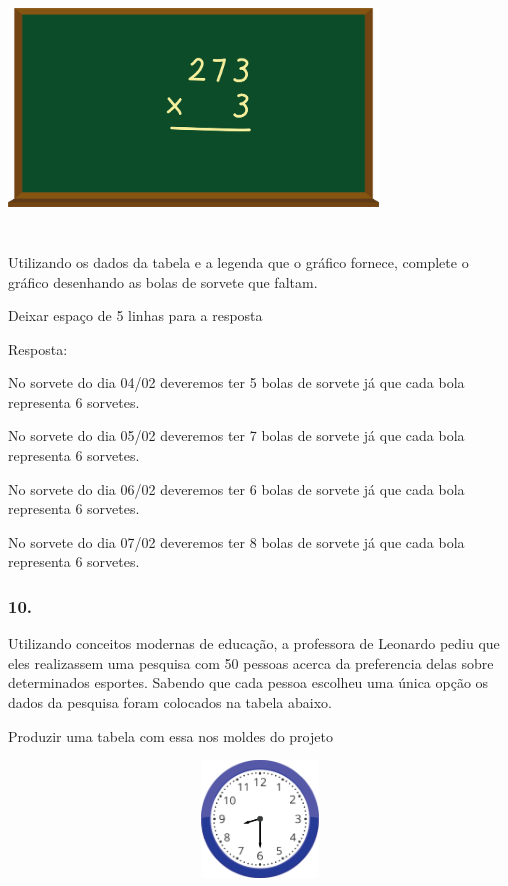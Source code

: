 \includegraphics[width=3.86538in,height=2.63899in]{media/image99.png}

Utilizando os dados da tabela e a legenda que o gráfico fornece,
complete o gráfico desenhando as bolas de sorvete que faltam.

Deixar espaço de 5 linhas para a resposta

Resposta:

No sorvete do dia 04/02 deveremos ter 5 bolas de sorvete já que cada
bola representa 6 sorvetes.

No sorvete do dia 05/02 deveremos ter 7 bolas de sorvete já que cada
bola representa 6 sorvetes.

No sorvete do dia 06/02 deveremos ter 6 bolas de sorvete já que cada
bola representa 6 sorvetes.

No sorvete do dia 07/02 deveremos ter 8 bolas de sorvete já que cada
bola representa 6 sorvetes.

\subsubsection{10.}\label{section-116}

Utilizando conceitos modernas de educação, a professora de Leonardo
pediu que eles realizassem uma pesquisa com 50 pessoas acerca da
preferencia delas sobre determinados esportes. Sabendo que cada pessoa
escolheu uma única opção os dados da pesquisa foram colocados na tabela
abaixo.

Produzir uma tabela com essa nos moldes do projeto

\includegraphics[width=5.39213in,height=1.22511in]{media/image100.png}

